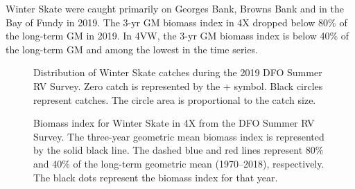\documentclass[11pt]{book}
\begin{document}
Winter Skate were caught primarily on Georges Bank, Browns Bank and in the Bay of Fundy in 2019. The 3-yr GM biomass index in 4X dropped below 80\% of the long-term GM in 2019. In 4VW, the 3-yr GM biomass index is below 40\% of the long-term GM and among the lowest in the time series.


\begin{figure}[htb]

{\centering {} 

}

\caption{Distribution of Winter Skate catches during the 2019 DFO Summer RV Survey. Zero catch is represented by the + symbol. Black circles represent catches. The circle area is proportional to the catch size.}\label{fig:90-map-winterskate}
\end{figure}

\begin{figure}[htb]

{\centering {} 

}

\caption{Biomass index for Winter Skate in 4X from the DFO Summer RV Survey. The three-year geometric mean biomass index is represented by the solid black line. The dashed blue and red lines represent 80\% and 40\% of the long-term geometric mean (1970--2018), respectively. The black dots represent the biomass index for that year.}\label{fig:91-fig-winterskate-biomass4X}
\end{figure}
\end{document}
